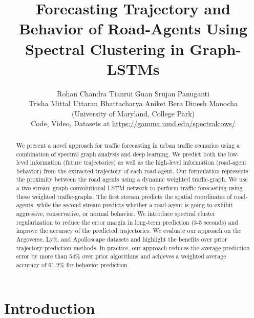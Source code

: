 \documentclass[10pt,twocolumn,letterpaper]{article}
\theoremstyle{plain}
\begin{document}
\title{Forecasting Trajectory and Behavior of Road-Agents Using Spectral Clustering in Graph-LSTMs }

\author{Rohan Chandra \qquad Tianrui Guan \qquad Srujan Panuganti\\
Trisha Mittal \qquad Uttaran Bhattacharya \qquad Aniket Bera \qquad Dinesh Manocha\\
{\small{ (University of Maryland, College Park)}}\\
{Code, Video, Datasets at \url{https://gamma.umd.edu/spectralcows/}}\vspace{-15pt}
}




\maketitle
\begin{abstract}
\vspace{-10pt}
We present a novel approach for traffic forecasting in urban traffic scenarios using a combination of spectral graph analysis and deep learning. We predict both the low-level information (future trajectories) as well as the high-level information (road-agent behavior) from the extracted trajectory of each road-agent. Our formulation represents the proximity between the road agents using a dynamic weighted traffic-graph. We use a two-stream graph convolutional LSTM network to perform traffic forecasting using these weighted traffic-graphs.
The first stream predicts the spatial coordinates of road-agents, while the second stream predicts whether a road-agent is going to exhibit aggressive, conservative, or normal behavior. We introduce spectral cluster regularization to reduce the error margin in long-term prediction (3-5 seconds) and improve the accuracy of the predicted trajectories.
We evaluate our approach on the Argoverse, Lyft, and Apolloscape datasets and highlight the benefits over prior trajectory prediction methods. In practice, our approach reduces the average prediction error by more than 54\% over prior algorithms and achieves a weighted average accuracy of 91.2\% for behavior prediction. 
\end{abstract}

\vspace{-15pt}
 \section{Introduction}
\end{document}

